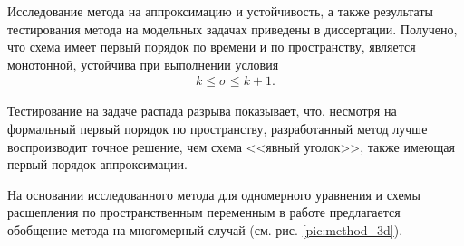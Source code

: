 Исследование метода на аппроксимацию и устойчивость, а также результаты тестирования метода на модельных задачах приведены в диссертации. Получено, что схема имеет первый порядок по времени и по пространству, является монотонной, устойчива при выполнении условия
\begin{align}
k \le \sigma \le k+1.
\end{align}

Тестирование на задаче распада разрыва показывает, что, несмотря на формальный первый порядок по пространству, разработанный метод лучше воспроизводит точное решение, чем схема <<явный уголок>>, также имеющая первый порядок аппроксимации.

На основании исследованного метода для одномерного уравнения и схемы расщепления по пространственным переменным в работе предлагается обобщение метода на многомерный случай (см. рис. \ref{pic:method_3d}).

